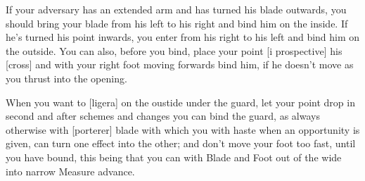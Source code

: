 \newpage


\newpage


If your adversary has an extended arm and has turned his blade
outwards, you should bring your blade from his left to his right and
bind him on the inside. If he's turned his point inwards, you
enter from his right to his left and bind him on the
outside. You can also, before you bind, place your point [i
prospective] his [cross] and with your right foot moving forwards
bind him, if he doesn't move as you thrust into the opening.

When you want to [ligera] on the oustide under the guard, let your
point drop in second and after schemes and changes you can bind
the guard, as always otherwise with [porterer] blade with which you
with haste when an opportunity is given, can turn one effect into the
other; and don't move your foot too fast, until you have bound,
this being that you can with Blade and Foot out of the wide into
narrow Measure advance.



